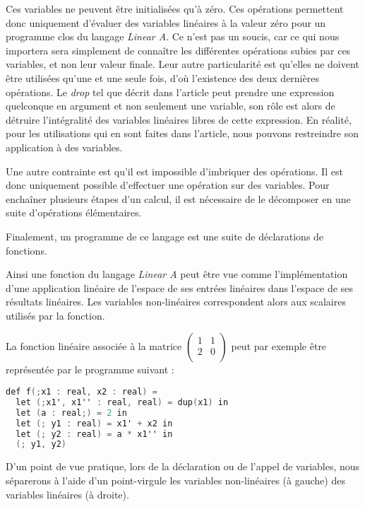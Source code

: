 \documentclass[a4paper, french, 11pt]{article}
\begin{document}
Ces variables ne peuvent être initialisées qu'à zéro. Ces opérations permettent donc uniquement d'évaluer des variables linéaires à la valeur zéro pour un programme clos du langage \textit{Linear A}. Ce n'est pas un soucis, car ce qui nous importera sera simplement de connaître les différentes opérations subies par ces variables, et non leur valeur finale. Leur autre particularité est qu'elles ne doivent être utilisées qu'une et une seule fois, d'où l'existence des deux dernières opérations. Le \textit{drop} tel que décrit dans l'article peut prendre une expression quelconque en argument et non seulement une variable, son rôle est alors de détruire l'intégralité des variables linéaires libres de cette expression. En réalité, pour les utilisations qui en sont faites dans l'article, nous pouvons restreindre son application à des variables.

Une autre contrainte est qu'il est impossible d'imbriquer des opérations. Il est donc uniquement possible d'effectuer une opération sur des variables. Pour enchaîner plusieurs étapes d'un calcul, il est nécessaire de le décomposer en une suite d'opérations élémentaires.

Finalement, un programme de ce langage est une suite de déclarations de fonctions.

Ainsi une fonction du langage \textit{Linear A} peut être vue comme l'implémentation d'une application linéaire de l'espace de ses entrées linéaires dans l'espace de ses résultats linéaires. Les variables non-linéaires correspondent alors aux scalaires utilisés par la fonction.

La fonction linéaire associée à la matrice 
$\begin{pmatrix}
  1&1\\
  2&0\\
\end{pmatrix}$
peut par exemple être représentée par le programme suivant :

\begin{lstlisting}[style=myStyle, language=C]
def f(;x1 : real, x2 : real) =
  let (;x1', x1'' : real, real) = dup(x1) in
  let (a : real;) = 2 in
  let (; y1 : real) = x1' + x2 in
  let (; y2 : real) = a * x1'' in
  (; y1, y2)
\end{lstlisting}

D'un point de vue pratique, lors de la déclaration ou de l'appel de variables, nous séparerons à l'aide d'un point-virgule les variables non-linéaires (à gauche) des variables linéaires (à droite).
\end{document}
